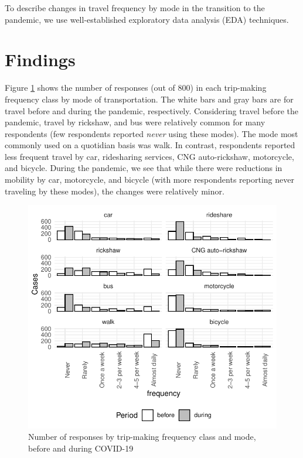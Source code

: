 \documentclass[]{elsarticle} %
\begin{document}
To describe changes in travel frequency by mode in the transition to the
pandemic, we use well-established exploratory data analysis (EDA)
techniques.

\hypertarget{findings}{%
\section{Findings}\label{findings}}

Figure \ref{fig:column-plot-cases} shows the number of responses (out of
800) in each trip-making frequency class by mode of transportation. The
white bars and gray bars are for travel before and during the pandemic,
respectively. Considering travel before the pandemic, travel by
rickshaw, and bus were relatively common for many respondents (few
respondents reported \emph{never} using these modes). The mode most
commonly used on a quotidian basis was walk. In contrast, respondents
reported less frequent travel by car, ridesharing services, CNG
auto-rickshaw, motorcycle, and bicycle. During the pandemic, we see that
while there were reductions in mobility by car, motorcycle, and bicycle
(with more respondents reporting never traveling by these modes), the
changes were relatively minor.

\begin{figure}
\centering
\includegraphics{Frequency-of-Travel-by-Mode-COVID-19-Bangladesh_files/figure-latex/column-plot-cases-before-after-1.pdf}
\caption{\label{fig:column-plot-cases}Number of responses by trip-making
frequency class and mode, before and during COVID-19}
\end{figure}
\end{document}
